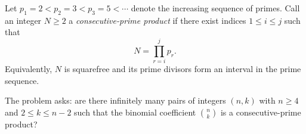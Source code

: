 Let $p_1=2<p_2=3<p_3=5<\cdots$ denote the increasing sequence of primes.
Call an integer $N\ge 2$ a \emph{consecutive-prime product} if there exist indices $1\le i\le j$ such that
\[
N=\prod_{r=i}^j p_r.
\]
Equivalently, $N$ is squarefree and its prime divisors form an interval in the prime sequence.

The problem asks: are there infinitely many pairs of integers $(n,k)$ with $n\ge 4$ and $2\le k\le n-2$ such that the binomial coefficient $\binom{n}{k}$ is a consecutive-prime product?
